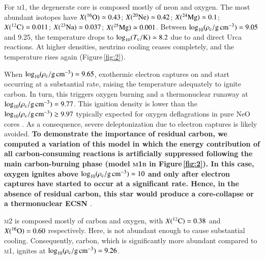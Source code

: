 \documentclass[twocolumn]{aa}
\begin{document}
For \textsc{m1}, the degenerate core is composed 
mostly of neon and oxygen. The most abundant isotopes have  $\abun{O}{16}\simeq 0.43$;  $\abun{Ne}{20}\simeq 0.42$; $\abun{Mg}{24}\simeq0.1$;  $\abun{C}{12}\simeq 0.011$; $\abun{Na}{23}\simeq 0.037$; $\abun{Mg}{25}\simeq 0.001$. Between $\logrhoc=9.05$ and 9.25, the temperature drops to $\logtc\simeq 8.2$ due to  and  direct Urca reactions. At higher densities, neutrino cooling ceases completely, and the temperature rises again (Figure\,\ref{fig:2}). 

When $\logrhoc=9.65$, exothermic electron captures on  and 
 start occurring at a substantial rate, raising the temperature 
adequately to ignite carbon. In turn, this triggers oxygen burning and a thermonuclear runaway at  $\logrhoc= 9.77$. This ignition density is  lower than the   $\logrhoc\ge 9.97$ typically expected for oxygen deflagrations  in pure NeO cores \citep{Jones:2018ule}. As a consequence, severe deleptonization due to  electron captures is likely avoided. {\bf To demonstrate the importance of residual carbon, we computed a variation of this model in which the energy contribution of all carbon-consuming reactions is artificially suppressed following the main carbon-burning phase (model \textsc{m1b} in Figure\,\ref{fig:2}). In this case, oxygen ignites above $\logrhoc\simeq 10$ and only after  electron captures have started to occur at a significant rate. Hence, in the absence of residual carbon, this star would produce a core-collapse or a thermonuclear ECSN \citep{Jones:2016asr}}.

\textsc{m2} is composed mostly of carbon and oxygen, with $\abun{C}{12}=0.38$ and $\abun{O}{16}=0.60$ respectively. 
 Here,  is not abundant enough to cause  substantial cooling. Consequently, carbon, which is significantly more abundant compared to \textsc{m1}, ignites at $\logrhoc=9.26$. 
 
\end{document}
